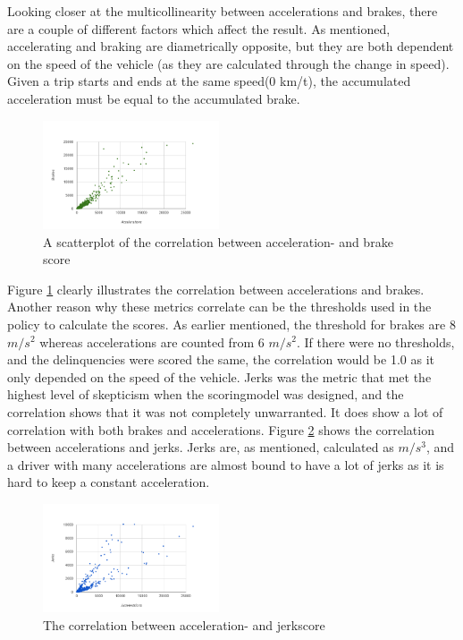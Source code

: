 Looking closer at the multicollinearity between accelerations and brakes, there are a couple of different factors which affect the result. As mentioned, accelerating and braking are diametrically opposite, but they are both dependent on the speed of the vehicle (as they are calculated through the change in speed). Given a trip starts and ends at the same speed(0 km/t), the accumulated acceleration must be equal to the accumulated brake.

\begin{figure}[tb]
\centering
\includegraphics[width=0.465\textwidth]{Pictures/abcorrel}
\caption{A scatterplot of the correlation between acceleration- and brake score}
\label{fig:abcorrel}
\end{figure}

Figure \ref{fig:abcorrel} clearly illustrates the correlation between accelerations and brakes. Another reason why these metrics correlate can be the thresholds used in the policy to calculate the scores. As earlier mentioned, the threshold for brakes are 8 $m/s^2$ whereas accelerations are counted from 6 $m/s^2$. If there were no thresholds, and the delinquencies were scored the same, the correlation would be 1.0 as it only depended on the speed of the vehicle. 
Jerks was the metric that met the highest level of skepticism when the scoringmodel was designed, and the correlation shows that it was not completely unwarranted. It does show a lot of correlation with both brakes and accelerations. Figure \ref{fig:ajcorrel} shows the correlation between accelerations and jerks. Jerks are, as mentioned, calculated as $m/s^3$, and a driver with many accelerations are almost bound to have a lot of jerks as it is hard to keep a constant acceleration.

\begin{figure}[tb]
\centering
\includegraphics[width=0.465\textwidth]{Pictures/ajcorrel}
\caption{The correlation between acceleration- and jerkscore}
\label{fig:ajcorrel}
\end{figure}
